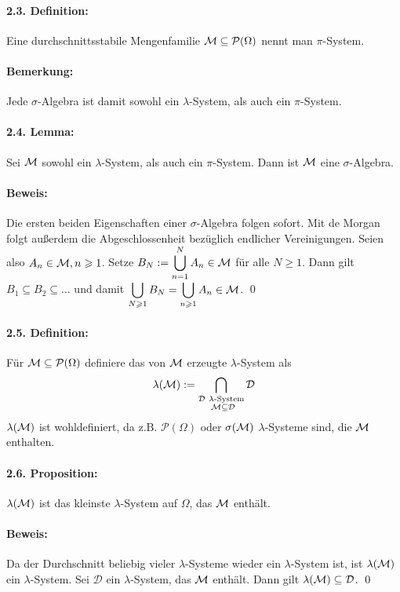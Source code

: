 \paragraph{2.3. Definition:}Eine durchschnittsstabile Mengenfamilie $\mathcal{M}\subseteq\mathcal{P}(\Omega)$ nennt man $\pi$-System.

\paragraph{Bemerkung:}Jede $\sigma$-Algebra ist damit sowohl ein $\lambda$-System, als auch ein $\pi$-System.

\paragraph{2.4. Lemma:}Sei $\mathcal{M}$ sowohl ein $\lambda$-System, als auch ein $\pi$-System. Dann ist $\mathcal{M}$ eine $\sigma$-Algebra.

\paragraph{Beweis:}Die ersten beiden Eigenschaften einer $\sigma$-Algebra folgen sofort. Mit de Morgan folgt au\ss{}erdem die Abgeschlossenheit bez\"uglich endlicher Vereinigungen. Seien also $A_n\in\mathcal{M},n\geqslant1$. Setze $B_N:=\displaystyle\bigcup_{n=1}^NA_n\in\mathcal{M}$ f\"ur alle $N\geq1$. Dann gilt $B_1\subseteq B_2\subseteq\hdots$ und damit $\displaystyle\bigcup_{N\geqslant1}B_N=\bigcup_{n\geqslant1}A_n\in\mathcal{M}$. \qed

\paragraph{2.5. Definition:}F\"ur $\mathcal{M}\subseteq\mathcal{P}(\Omega)$ definiere das von $\mathcal{M}$ erzeugte $\lambda$-System als
$$\lambda(\M):=\bigcap_{\substack{\mathcal{D}\ \lambda\text{-System}\\ \M\subseteq\mathcal{D}}}\mathcal{D}$$
$\lambda(\mathcal{M})$ ist wohldefiniert, da z.B. $\mathcal{P}(\Omega)$ oder $\sigma(\mathcal{M})$ $\lambda$-Systeme sind, die $\mathcal{M}$ enthalten. 

\paragraph{2.6. Proposition:}$\lambda(\mathcal{M})$ ist das kleinste $\lambda$-System auf $\Omega$, das $\mathcal{M}$ enth\"alt. 

\paragraph{Beweis:}Da der Durchschnitt beliebig vieler $\lambda$-Systeme wieder ein $\lambda$-System ist, ist $\lambda(\mathcal{M})$ ein $\lambda$-System. Sei $\mathcal{D}$ ein $\lambda$-System, das $\mathcal{M}$ enth\"alt. Dann gilt $\lambda(\mathcal{M})\subseteq\mathcal{D}$. \qed

